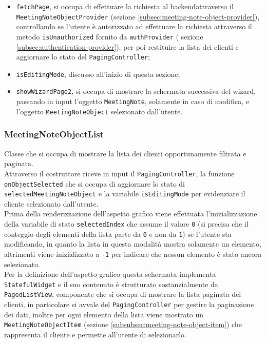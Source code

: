 \begin{itemize}
    \item \lstinline{fetchPage}, si occupa di effettuare la richiesta al \gls{backend}\glsoccur attraverso il \lstinline{MeetingNoteObjectProvider} (sezione \ref{subsec:meeting-note-object-provider}), controllando se l'utente è autorizzato ad effettuare la richiesta attraverso il metodo \lstinline{isUnauthorized} fornito da \lstinline{authProvider} ( sezione \ref{subsec:authentication-provider}), per poi restituire la lista dei clienti e aggiornare lo stato del \lstinline{PagingController};
    \item \lstinline{isEditingMode}, discusso all'inizio di questa sezione;
    \item \lstinline{showWizardPage2}, si occupa di mostrare la schermata successiva del \gls{wizard}\glsoccur, passando in input l'oggetto \lstinline{MeetingNote}, solamente in caso di modifica, e l'oggetto \lstinline{MeetingNoteObject} selezionato dall'utente.
\end{itemize}

\subsubsection*{MeetingNoteObjectList}
\label{subsubsec:meeting-note-object-list}

\indent Classe che si occupa di mostrare la lista dei clienti opportunamente filtrata e paginata. \\
Attraverso il costruttore riceve in input il \lstinline{PagingController}, la funzione \lstinline{onObjectSelected} che si occupa di aggiornare lo stato di \lstinline{selectedMeetingNoteObject} e la variabile \lstinline{isEditingMode} per evidenziare il cliente selezionato dall'utente. \\

\indent Prima della renderizzazione dell'aspetto grafico viene effettuata l'inizializzazione della variabile di stato \lstinline{selectedIndex} che assume il valore \lstinline{0} (si precisa che il conteggio degli elementi della lista parte da \lstinline{0} e non da \lstinline{1}) se l'utente sta modificando, in quanto la lista in questa modalità mostra solamente un elemento, altrimenti viene inizializzato a \lstinline{-1} per indicare che nessun elemento è stato ancora selezionato. \\
Per la definizione dell'aspetto grafico questa schermata implementa \lstinline{StatefulWidget} e il suo contenuto è strutturato sostanzialmente da \lstinline{PagedListView}\cite{site:infinite-scroll-pagination}, componente che si occupa di mostrare la lista paginata dei clienti, in particolare si avvale del \lstinline{PagingController} per gestire la paginazione dei dati, inoltre per ogni elemento della lista viene mostrato un \lstinline{MeetingNoteObjectItem} (sezione \ref{subsubsec:meeting-note-object-item}) che rappresenta il cliente e permette all'utente di selezionarlo.

